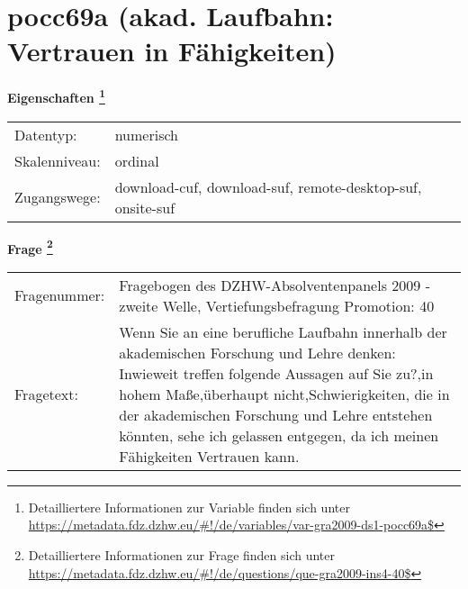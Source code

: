 
    \setcounter{footnote}{0}

    \vspace*{-1.8cm}
	\section{pocc69a (akad. Laufbahn: Vertrauen in Fähigkeiten)}
	\label{section:pocc69a}



    \vspace*{0.5cm}
    \noindent\textbf{Eigenschaften
	\footnote{Detailliertere Informationen zur Variable finden sich unter
		\url{https://metadata.fdz.dzhw.eu/\#!/de/variables/var-gra2009-ds1-pocc69a$}}}\\
	\begin{tabularx}{\hsize}{@{}lX}
	Datentyp: & numerisch \\
	Skalenniveau: & ordinal \\
	Zugangswege: &
	  download-cuf, 
	  download-suf, 
	  remote-desktop-suf, 
	  onsite-suf
 \\
    \end{tabularx}



				\vspace*{0.5cm}
                \noindent\textbf{Frage
	                \footnote{Detailliertere Informationen zur Frage finden sich unter
		              \url{https://metadata.fdz.dzhw.eu/\#!/de/questions/que-gra2009-ins4-40$}}}\\
				\begin{tabularx}{\hsize}{@{}lX}
					Fragenummer: &
					  Fragebogen des DZHW-Absolventenpanels 2009 - zweite Welle, Vertiefungsbefragung Promotion:
					  40
 \\
					Fragetext: & Wenn Sie an eine berufliche Laufbahn innerhalb der akademischen Forschung und Lehre denken: Inwieweit treffen folgende Aussagen auf Sie zu?,in hohem Maße,überhaupt nicht,Schwierigkeiten, die in der akademischen Forschung und Lehre entstehen könnten, sehe ich gelassen entgegen, da ich meinen Fähigkeiten Vertrauen kann. \\
				\end{tabularx}





